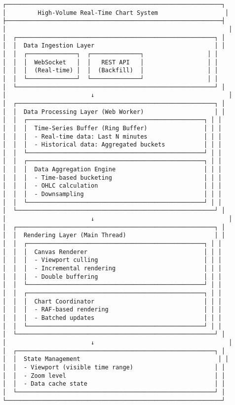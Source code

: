 \documentclass[11pt]{article}
\begin{document}
\begin{verbatim}
┌─────────────────────────────────────────────────────────────┐
│         High-Volume Real-Time Chart System                   │
├─────────────────────────────────────────────────────────────┤
│                                                               │
│  ┌────────────────────────────────────────────────────────┐ │
│  │  Data Ingestion Layer                                  │ │
│  │  ┌──────────────┐  ┌──────────────┐                  │ │
│  │  │  WebSocket   │  │   REST API   │                  │ │
│  │  │  (Real-time) │  │  (Backfill)  │                  │ │
│  │  └──────────────┘  └──────────────┘                  │ │
│  └────────────────────────────────────────────────────────┘ │
│                        ↓                                      │
│  ┌────────────────────────────────────────────────────────┐ │
│  │  Data Processing Layer (Web Worker)                    │ │
│  │  ┌──────────────────────────────────────────────────┐ │ │
│  │  │  Time-Series Buffer (Ring Buffer)                │ │ │
│  │  │  - Real-time data: Last N minutes                │ │ │
│  │  │  - Historical data: Aggregated buckets           │ │ │
│  │  └──────────────────────────────────────────────────┘ │ │
│  │  ┌──────────────────────────────────────────────────┐ │ │
│  │  │  Data Aggregation Engine                         │ │ │
│  │  │  - Time-based bucketing                          │ │ │
│  │  │  - OHLC calculation                              │ │ │
│  │  │  - Downsampling                                  │ │ │
│  │  └──────────────────────────────────────────────────┘ │ │
│  └────────────────────────────────────────────────────────┘ │
│                        ↓                                      │
│  ┌────────────────────────────────────────────────────────┐ │
│  │  Rendering Layer (Main Thread)                         │ │
│  │  ┌──────────────────────────────────────────────────┐ │ │
│  │  │  Canvas Renderer                                 │ │ │
│  │  │  - Viewport culling                              │ │ │
│  │  │  - Incremental rendering                         │ │ │
│  │  │  - Double buffering                              │ │ │
│  │  └──────────────────────────────────────────────────┘ │ │
│  │  ┌──────────────────────────────────────────────────┐ │ │
│  │  │  Chart Coordinator                               │ │ │
│  │  │  - RAF-based rendering                           │ │ │
│  │  │  - Batched updates                               │ │ │
│  │  └──────────────────────────────────────────────────┘ │ │
│  └────────────────────────────────────────────────────────┘ │
│                        ↓                                      │
│  ┌────────────────────────────────────────────────────────┐ │
│  │  State Management                                       │ │
│  │  - Viewport (visible time range)                       │ │
│  │  - Zoom level                                          │ │
│  │  - Data cache state                                    │ │
│  └────────────────────────────────────────────────────────┘ │
└─────────────────────────────────────────────────────────────┘
\end{verbatim}
\end{document}
